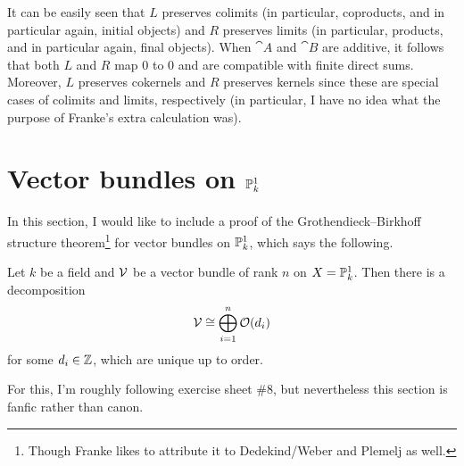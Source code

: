 \documentclass[a4paper,parskip=half,numbers=enddot, DIV=12]{scrreprt}
\begin{document}
\begin{rem}
	It can be easily seen that $L$ preserves colimits (in particular, coproducts, and in particular again, initial objects) and $R$ preserves limits (in particular, products, and in particular again, final objects). When ${\cat A}$ and ${\cat B}$ are additive, it follows that both $L$ and $R$ map $0$ to $0$ and are compatible with finite direct sums. Moreover, $L$ preserves cokernels and $R$ preserves kernels since these are special cases of colimits and limits, respectively (in particular, I have no idea what the purpose of Franke's extra calculation was).%
\end{rem}
\section{Vector bundles on \texorpdfstring{$\mathbb{P}_k^1$}{P}}
In this section, I would like to include a proof of the Grothendieck--Birkhoff structure theorem\footnote{Though Franke likes to attribute it to Dedekind/Weber and Plemelj as well.} for vector bundles on $\mathbb{P}_k^1$, which says the following.
\begin{thm}
	Let $k$ be a field and $\mathcal{V}$ be a vector bundle of rank $n$ on $X=\mathbb{P}_k^1$. Then there is a decomposition
	\begin{align*}
		\mathcal{V}\cong\bigoplus_{i=1}^n\mathcal{O}(d_i)
	\end{align*}
	for some $d_i\in \mathbb{Z}$, which are unique up to order.
\end{thm}
For this, I'm roughly following exercise sheet \#8, but nevertheless this section is fanfic rather than canon.
\end{document}
